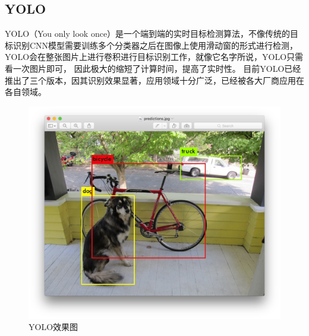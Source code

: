     \subsection{YOLO}
    YOLO（You only look once）是一个端到端的实时目标检测算法，不像传统的目标识别CNN模型需要训练多个分类器之后在图像上使用滑动窗的形式进行检测，YOLO会在整张图片上进行卷积进行目标识别工作，就像它名字所说，YOLO只需看一次图片即可，
    因此极大的缩短了计算时间，提高了实时性。
    目前YOLO已经推出了三个版本，因其识别效果显著，应用领域十分广泛，已经被各大厂商应用在各自领域。
    \begin{figure}[h]
        \centering
        \includegraphics[scale=0.2]{../pdf/yolo.png}
        \caption{YOLO效果图}
        \label{}
    \end{figure}
